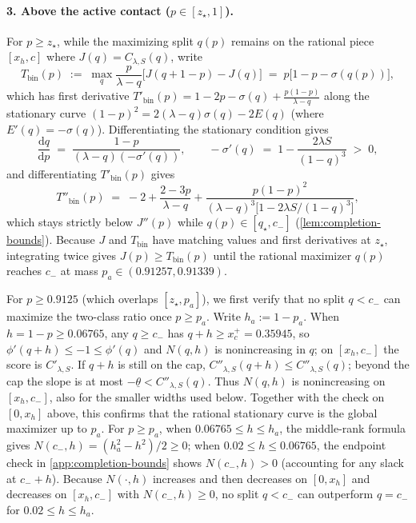 \documentclass[11pt]{article}
\numberwithin{equation}{section}
\theoremstyle{plain}
\theoremstyle{definition}
\newcommand{\1}{\mathbf{1}}
\begin{document}
\paragraph{3. Above the active contact ($p \in [z_\star, 1]$).}
For $p \ge z_\star$, while the maximizing split $q(p)$ remains on the rational piece $[x_h, c]$ where $J(q) = C_{\lambda, S}(q)$, write
\[
  T_{\mathrm{bin}}(p) \;:=\; \max_q \frac{p}{\lambda - q}\bigl[J(q + 1 - p) - J(q)\bigr] \;=\; p\bigl[1 - p - \sigma(q(p))\bigr],
\]
which has first derivative $T'_{\mathrm{bin}}(p) = 1 - 2p - \sigma(q) + \frac{p(1 - p)}{\lambda - q}$ along the stationary curve $(1 - p)^2 = 2(\lambda - q)\sigma(q) - 2E(q)$ (where $E'(q) = -\sigma(q)$). Differentiating the stationary condition gives
\[
  \frac{\mathrm{d}q}{\mathrm{d}p} \;=\; \frac{1 - p}{(\lambda - q)(-\sigma'(q))},
  \qquad
  -\sigma'(q) \;=\; 1 - \frac{2\lambda S}{(1 - q)^3} \;>\; 0,
\]
and differentiating $T'_{\mathrm{bin}}(p)$ gives
\begin{equation}
  T''_{\mathrm{bin}}(p) \;=\; -2 + \frac{2 - 3p}{\lambda - q} + \frac{p(1 - p)^2}{(\lambda - q)^3\bigl[1 - 2\lambda S/(1 - q)^3\bigr]},
  \label{eq:binary-curvature}
\end{equation}
which stays strictly below $J''(p)$ while $q(p) \in [q_\star, c_-]$ (\cref{lem:completion-bounds}). Because $J$ and $T_{\mathrm{bin}}$ have matching values and first derivatives at $z_\star$, integrating twice gives $J(p) \ge T_{\mathrm{bin}}(p)$ until the rational maximizer $q(p)$ reaches $c_-$ at mass $p_a \in (0.91257, 0.91339)$.

For $p \ge 0.9125$ (which overlaps $[z_\star, p_a]$), we first verify that no split $q < c_-$ can maximize the two-class ratio once $p \ge p_a$. Write $h_a := 1 - p_a$. When $h = 1 - p \ge 0.06765$, any $q \ge c_-$ has $q + h \ge x_c^+ = 0.35945$, so $\phi'(q + h) \le -1 \le \phi'(q)$ and $N(q, h)$ is nonincreasing in $q$; on $[x_h,c_-]$ the score is $C'_{\lambda,S}$. If $q+h$ is still on the cap, $C''_{\lambda,S}(q+h)\le C''_{\lambda,S}(q)$; beyond the cap the slope is at most $-\underline\theta<C''_{\lambda,S}(q)$. Thus $N(q,h)$ is nonincreasing on $[x_h,c_-]$, also for the smaller widths used below. Together with the check on $[0, x_h]$ above, this confirms that the rational stationary curve is the global maximizer up to $p_a$. For $p \ge p_a$, when $0.06765 \le h \le h_a$, the middle-rank formula gives $N(c_-, h) = (h_a^2 - h^2)/2 \ge 0$; when $0.02 \le h \le 0.06765$, the endpoint check in \cref{app:completion-bounds} shows $N(c_-, h) > 0$ (accounting for any slack at $c_- + h$). Because $N(\cdot, h)$ increases and then decreases on $[0, x_h]$ and decreases on $[x_h, c_-]$ with $N(c_-, h) \ge 0$, no split $q < c_-$ can outperform $q = c_-$ for $0.02 \le h \le h_a$.
\end{document}
